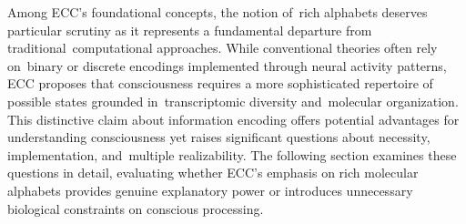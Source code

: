 Among ECC's foundational concepts, the notion of~rich alphabets deserves particular scrutiny as it represents a fundamental departure from traditional~computational approaches. While conventional theories often rely on~binary or discrete encodings implemented through neural activity patterns, ECC proposes that consciousness requires a more sophisticated repertoire of possible states grounded in~transcriptomic diversity and~molecular organization. This distinctive claim about information encoding offers potential advantages for understanding consciousness yet raises significant questions about necessity, implementation, and~multiple realizability. The following section examines these questions in detail, evaluating whether ECC's emphasis on rich molecular alphabets provides genuine explanatory power or introduces unnecessary biological constraints on conscious processing.




